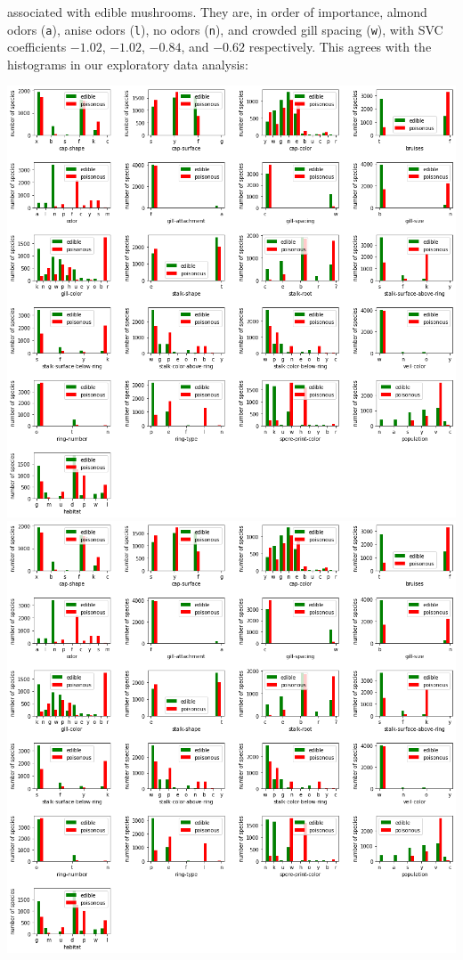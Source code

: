 \documentclass[11pt]{article}
\begin{document}
associated with edible mushrooms. They are, in order of importance, almond
odors (\texttt{a}), anise odors (\texttt{l}), no odors (\texttt{n}), and
crowded gill spacing (\texttt{w}), with SVC coefficients 
$-1.02$, $-1.02$, $-0.84$, and $-0.62$ respectively.
This agrees with the histograms in our exploratory data
analysis:
\begin{center}
\includegraphics[scale=0.8,trim=0 575 680 145,clip=true]{histograms.png}
\includegraphics[scale=0.8,trim=460 575 220 145,clip=true]{histograms.png}
\end{center}
\end{document}
